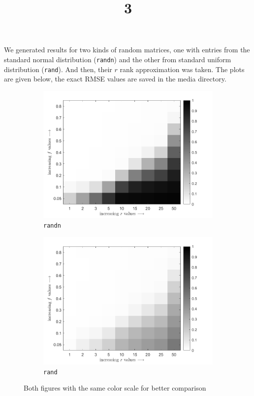 \documentclass[a4paper]{article}
\title{3}
\date{}
\begin{document}
\maketitle
We generated results for two kinds of random matrices, one with entries from the standard normal distribution (\texttt{randn}) and the other from standard uniform distribution (\texttt{rand}). And then, their $r$ rank approximation was taken. The plots are given below, the exact RMSE values are saved in the media directory.
\begin{figure}[H]
	\centering
	\begin{subfigure}{0.45\linewidth}
		\centering
		\includegraphics[width=\linewidth]{../media/Q2 randn RMSEs.png}
		\caption{\texttt{randn}}
	\end{subfigure}
	\begin{subfigure}{0.45\linewidth}
		\centering
		\includegraphics[width=\linewidth]{../media/Q2 rand RMSEs.png}
		\caption{\texttt{rand}}
	\end{subfigure}
	\caption{Both figures with the same color scale for better comparison}
\end{figure}
\end{document}
